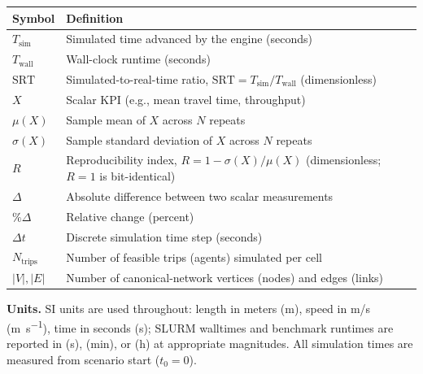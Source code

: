 \setlength{\tabcolsep}{10pt}
\renewcommand{\arraystretch}{1.1}
\begin{xltabular}{\textwidth}{@{} l X @{}}
\toprule
\textbf{Symbol} & \textbf{Definition} \\
\midrule
$T_{\text{sim}}$   & Simulated time advanced by the engine (seconds) \\
$T_{\text{wall}}$  & Wall-clock runtime (seconds) \\
$\mathrm{SRT}$     & Simulated-to-real-time ratio, $\mathrm{SRT} = T_{\text{sim}} / T_{\text{wall}}$ (dimensionless) \\
$X$                & Scalar KPI (e.g., mean travel time, throughput) \\
$\mu(X)$           & Sample mean of $X$ across $N$ repeats \\
$\sigma(X)$        & Sample standard deviation of $X$ across $N$ repeats \\
$R$                & Reproducibility index, $R = 1 - \sigma(X) / \mu(X)$ (dimensionless; $R = 1$ is bit-identical) \\
$\Delta$           & Absolute difference between two scalar measurements \\
$\%\Delta$         & Relative change (percent) \\
$\Delta t$         & Discrete simulation time step (seconds) \\
$N_{\text{trips}}$ & Number of feasible trips (agents) simulated per cell \\
$|V|, |E|$         & Number of canonical-network vertices (nodes) and edges (links) \\
\bottomrule
\end{xltabular}

\bigskip

\noindent\textbf{Units.}\;
SI units are used throughout: length in meters (\si{m}), speed in m/s (\si{m\per s}), time in seconds (\si{s}); SLURM walltimes and benchmark runtimes are reported in (s), (min), or (h) at appropriate magnitudes. All simulation times are measured from scenario start ($t_0 = 0$).

\clearpage
